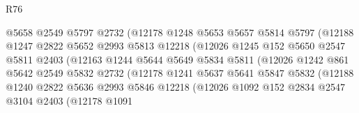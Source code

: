 \begin{lexlean}{R76}
\begin{coremodule}
                              @5658
                              @2549
                              @5797
                              @2732
                              (@12178
                                @1248
                                @5653
                                @5657
                                @5814
                                @5797
                                (@12188
                                  @1247
                                  @2822
                                  @5652
                                  @2993
                                  @5813
                                  @12218
                                  (@12026
                                    @1245
                                    @152
                                    @5650
                                    @2547
                                    @5811
                                    @2403
                                    (@12163
                                      @1244
                                      @5644
                                      @5649
                                      @5834
                                      @5811
                                      (@12026
                                        @1242
                                        @861
                                        @5642
                                        @2549
                                        @5832
                                        @2732
                                        (@12178
                                          @1241
                                          @5637
                                          @5641
                                          @5847
                                          @5832
                                          (@12188
                                            @1240
                                            @2822
                                            @5636
                                            @2993
                                            @5846
                                            @12218
                                            (@12026
                                              @1092
                                              @152
                                              @2834
                                              @2547
                                              @3104
                                              @2403
                                              (@12178
                                                @1091

\end{coremodule}
\end{lexlean}
